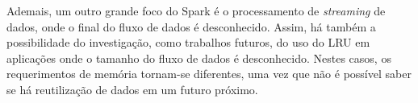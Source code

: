 Ademais, um outro grande foco do Spark é o processamento de \textit{streaming} de dados, onde o final do fluxo de dados é desconhecido. Assim, há também a possibilidade do investigação, como trabalhos futuros, do uso do LRU em aplicações onde o tamanho do fluxo de dados é desconhecido. Nestes casos, os requerimentos de memória tornam-se diferentes, uma vez que não é possível saber se há reutilização de dados em um futuro próximo.
